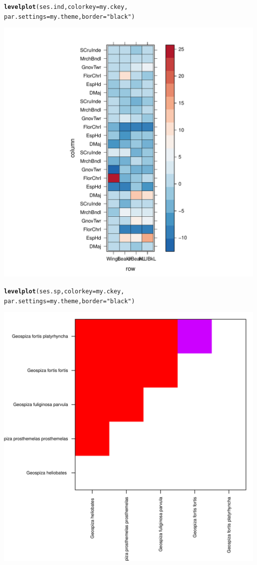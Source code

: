 \documentclass[12pt]{article}\usepackage[]{graphicx}\usepackage[]{color}
\makeatletter
\def\maxwidth{ %
  \ifdim\Gin@nat@width>\linewidth
    \linewidth
  \else
    \Gin@nat@width
  \fi
}
\newcommand{\hlstr}[1]{\textcolor[rgb]{0.192,0.494,0.8}{#1}}%
\newcommand{\hlstd}[1]{\textcolor[rgb]{0.345,0.345,0.345}{#1}}%
\newcommand{\hlkwc}[1]{\textcolor[rgb]{0.333,0.667,0.333}{#1}}%
\newcommand{\hlkwd}[1]{\textcolor[rgb]{0.737,0.353,0.396}{\textbf{#1}}}%
\newenvironment{kframe}{%
 \def\at@end@of@kframe{}%
 \ifinner\ifhmode%
  \def\at@end@of@kframe{\end{minipage}}%
  \begin{minipage}{\columnwidth}%
 \fi\fi%
 \def\FrameCommand##1{\hskip\@totalleftmargin \hskip-\fboxsep
 \colorbox{shadecolor}{##1}\hskip-\fboxsep
     \hskip-\linewidth \hskip-\@totalleftmargin \hskip\columnwidth}%
 \MakeFramed {\advance\hsize-\width
   \@totalleftmargin\z@ \linewidth\hsize
   \@setminipage}}%
 {\par\unskip\endMakeFramed%
 \at@end@of@kframe}
\newenvironment{knitrout}{}{} %
\makeatother
\begin{document}
\begin{knitrout}
\begin{kframe}
\begin{alltt}
\hlkwd{levelplot}\hlstd{(ses.ind,} \hlkwc{colorkey}\hlstd{=my.ckey,}
          \hlkwc{par.settings}\hlstd{=my.theme,}\hlkwc{border}\hlstd{=}\hlstr{"black"}\hlstd{)}
\end{alltt}
\end{kframe}
\includegraphics[width=\maxwidth]{figure/unnamed-chunk-571} 
\begin{kframe}\begin{alltt}
\hlkwd{levelplot}\hlstd{(ses.sp,} \hlkwc{colorkey}\hlstd{=my.ckey,}
          \hlkwc{par.settings}\hlstd{=my.theme,}\hlkwc{border}\hlstd{=}\hlstr{"black"}\hlstd{)}
\end{alltt}
\end{kframe}
\includegraphics[width=\maxwidth]{figure/unnamed-chunk-572} 

\end{knitrout}
\end{document}
